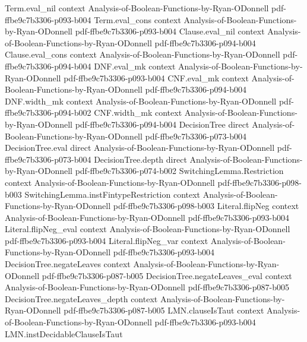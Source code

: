 \begin{theorem}
\proofstep
  {Term.eval_nil}
  {context}
  {Analysis-of-Boolean-Functions-by-Ryan-ODonnell}
  {pdf-ffbe9c7b3306-p093-b004}
\proofstep
  {Term.eval_cons}
  {context}
  {Analysis-of-Boolean-Functions-by-Ryan-ODonnell}
  {pdf-ffbe9c7b3306-p093-b004}
\proofstep
  {Clause.eval_nil}
  {context}
  {Analysis-of-Boolean-Functions-by-Ryan-ODonnell}
  {pdf-ffbe9c7b3306-p094-b004}
\proofstep
  {Clause.eval_cons}
  {context}
  {Analysis-of-Boolean-Functions-by-Ryan-ODonnell}
  {pdf-ffbe9c7b3306-p094-b004}
\proofstep
  {DNF.eval_mk}
  {context}
  {Analysis-of-Boolean-Functions-by-Ryan-ODonnell}
  {pdf-ffbe9c7b3306-p093-b004}
\proofstep
  {CNF.eval_mk}
  {context}
  {Analysis-of-Boolean-Functions-by-Ryan-ODonnell}
  {pdf-ffbe9c7b3306-p094-b004}
\proofstep
  {DNF.width_mk}
  {context}
  {Analysis-of-Boolean-Functions-by-Ryan-ODonnell}
  {pdf-ffbe9c7b3306-p094-b002}
\proofstep
  {CNF.width_mk}
  {context}
  {Analysis-of-Boolean-Functions-by-Ryan-ODonnell}
  {pdf-ffbe9c7b3306-p094-b004}
\proofstep
  {DecisionTree}
  {direct}
  {Analysis-of-Boolean-Functions-by-Ryan-ODonnell}
  {pdf-ffbe9c7b3306-p073-b004}
\proofstep
  {DecisionTree.eval}
  {direct}
  {Analysis-of-Boolean-Functions-by-Ryan-ODonnell}
  {pdf-ffbe9c7b3306-p073-b004}
\proofstep
  {DecisionTree.depth}
  {direct}
  {Analysis-of-Boolean-Functions-by-Ryan-ODonnell}
  {pdf-ffbe9c7b3306-p074-b002}
\proofstep
  {SwitchingLemma.Restriction}
  {context}
  {Analysis-of-Boolean-Functions-by-Ryan-ODonnell}
  {pdf-ffbe9c7b3306-p098-b003}
\proofstep
  {SwitchingLemma.instFintypeRestriction}
  {context}
  {Analysis-of-Boolean-Functions-by-Ryan-ODonnell}
  {pdf-ffbe9c7b3306-p098-b003}
\proofstep
  {Literal.flipNeg}
  {context}
  {Analysis-of-Boolean-Functions-by-Ryan-ODonnell}
  {pdf-ffbe9c7b3306-p093-b004}
\proofstep
  {Literal.flipNeg_eval}
  {context}
  {Analysis-of-Boolean-Functions-by-Ryan-ODonnell}
  {pdf-ffbe9c7b3306-p093-b004}
\proofstep
  {Literal.flipNeg_var}
  {context}
  {Analysis-of-Boolean-Functions-by-Ryan-ODonnell}
  {pdf-ffbe9c7b3306-p093-b004}
\proofstep
  {DecisionTree.negateLeaves}
  {context}
  {Analysis-of-Boolean-Functions-by-Ryan-ODonnell}
  {pdf-ffbe9c7b3306-p087-b005}
\proofstep
  {DecisionTree.negateLeaves_eval}
  {context}
  {Analysis-of-Boolean-Functions-by-Ryan-ODonnell}
  {pdf-ffbe9c7b3306-p087-b005}
\proofstep
  {DecisionTree.negateLeaves_depth}
  {context}
  {Analysis-of-Boolean-Functions-by-Ryan-ODonnell}
  {pdf-ffbe9c7b3306-p087-b005}
\proofstep
  {LMN.clauseIsTaut}
  {context}
  {Analysis-of-Boolean-Functions-by-Ryan-ODonnell}
  {pdf-ffbe9c7b3306-p093-b004}
\proofstep
  {LMN.instDecidableClauseIsTaut}

\end{theorem}

